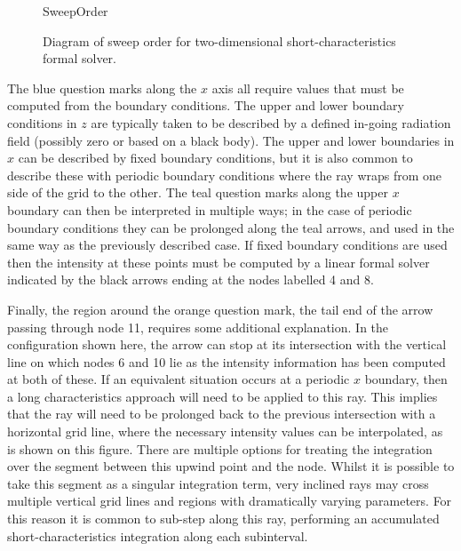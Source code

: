 \begin{figure}
\centering
{SweepOrder}
\caption{Diagram of sweep order for two-dimensional short-characteristics formal solver.}
\label{Fig:2DSweep}
\end{figure}

The {\color{TolBlue} blue} question marks along the $x$ axis all require values that must be computed from the boundary conditions.
The upper and lower boundary conditions in $z$ are typically taken to be described by a defined in-going radiation field (possibly zero or based on a black body).
The upper and lower boundaries in $x$ can be described by fixed boundary conditions, but it is also common to describe these with periodic boundary conditions where the ray wraps from one side of the grid to the other.
The {\color{TolTeal} teal} question marks along the upper $x$ boundary can then be interpreted in multiple ways; in the case of periodic boundary conditions they can be prolonged along the {\color{TolTeal} teal} arrows, and used in the same way as the previously described case.
If fixed boundary conditions are used then the intensity at these points must be computed by a linear formal solver indicated by the black arrows ending at the nodes labelled 4 and 8.

Finally, the region around the {\color{TolOrange} orange} question mark, the tail end of the arrow passing through node 11, requires some additional explanation.
In the configuration shown here, the arrow can stop at its intersection with the vertical line on which nodes 6 and 10 lie as the intensity information has been computed at both of these.
If an equivalent situation occurs at a periodic $x$ boundary, then a long characteristics approach will need to be applied to this ray.
This implies that the ray will need to be prolonged back to the previous intersection with a horizontal grid line, where the necessary intensity values can be interpolated, as is shown on this figure.
There are multiple options for treating the integration over the segment between this upwind point and the node.
Whilst it is possible to take this segment as a singular integration term, very inclined rays may cross multiple vertical grid lines and regions with dramatically varying parameters.
For this reason it is common to sub-step along this ray, performing an accumulated short-characteristics integration along each subinterval.

